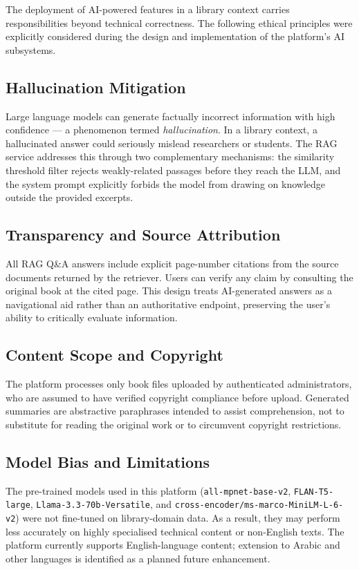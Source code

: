 The deployment of AI-powered features in a library context carries
responsibilities beyond technical correctness. The following ethical principles
were explicitly considered during the design and implementation of the
platform's AI subsystems.

\subsection{Hallucination Mitigation}

Large language models can generate factually incorrect information with high
confidence --- a phenomenon termed \textit{hallucination}. In a library
context, a hallucinated answer could seriously mislead researchers or students.
The RAG service addresses this through two complementary mechanisms: the
similarity threshold filter rejects weakly-related passages before they reach
the LLM, and the system prompt explicitly forbids the model from drawing on
knowledge outside the provided excerpts.

\subsection{Transparency and Source Attribution}

All RAG Q\&A answers include explicit page-number citations from the source
documents returned by the retriever. Users can verify any claim by consulting
the original book at the cited page. This design treats AI-generated answers
as a navigational aid rather than an authoritative endpoint, preserving the
user's ability to critically evaluate information.

\subsection{Content Scope and Copyright}

The platform processes only book files uploaded by authenticated
administrators, who are assumed to have verified copyright compliance before
upload. Generated summaries are abstractive paraphrases intended to assist
comprehension, not to substitute for reading the original work or to
circumvent copyright restrictions.

\subsection{Model Bias and Limitations}

The pre-trained models used in this platform
(\texttt{all-mpnet-base-v2}, \texttt{FLAN-T5-large},
\texttt{Llama-3.3-70b-Versatile}, and
\texttt{cross-encoder/ms-marco-MiniLM-L-6-v2}) were not fine-tuned on
library-domain data. As a result, they may perform less accurately on highly
specialised technical content or non-English texts. The platform currently
supports English-language content; extension to Arabic and other languages is
identified as a planned future enhancement.

